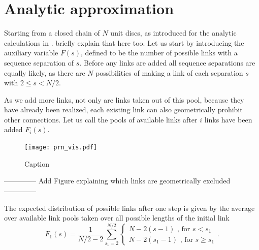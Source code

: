 \documentclass[reprint,amsmath,amssymb,rmp,onecolumn,notitlepage,11pt]{revtex4-1}
\newcommand{\red}[1]{\textcolor{red!80!black}{#1}}
\begin{document}
\section*{Analytic approximation}
Starting from a closed chain of $N$ unit discs, as introduced for the analytic calculations in \cite{molkenthin2016scaling}. \red{briefly explain that here too.}
Let us start by introducing the auxiliary variable $F(s)$, defined to be the number of possible links with a sequence separation of $s$. Before any links are added all sequence separations are equally likely, as there are $N$ possibilities of making a link of each separation $s$ with $2\leq s < N/2$.

As we add more links, not only are links taken out of this pool, because they have already been realized, each existing link can also geometrically prohibit other connections.
Let us call the pools of available links after $i$ links have been added $F_i(s)$.
\begin{figure}
    \centering
    \texttt{[image: prn\_vis.pdf]}
    \caption{Caption}
    \label{fig:fig_prn_vis}
\end{figure}

-------------- Add Figure explaining which links are geometrically excluded --------------

The expected distribution of possible links after one step is given by the average over available link pools taken over all possible lengths of the initial link
\begin{equation}
    F_1(s)= \frac{1}{N/2-2} \sum_{s_1=2}^{N/2} { \begin{cases}
    N-2(s-1) \text{ , for } s<s_1\\
    N-2(s_1 -1)\text{ , for } s\geq s_1
    \end{cases}}.
\end{equation}
\end{document}
